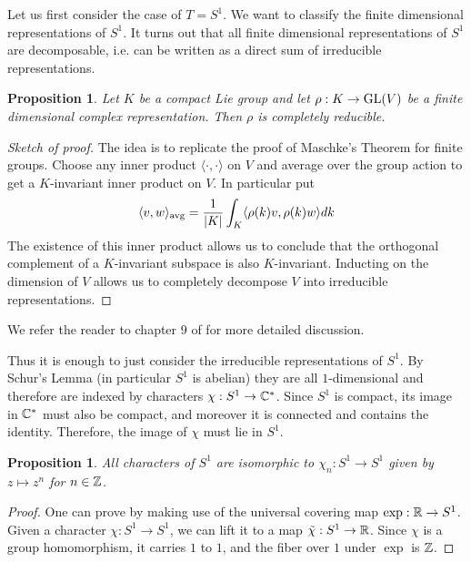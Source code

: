 \documentclass{amsart}
\numberwithin{equation}{section}
\theoremstyle{plain} %
\newtheorem{proposition}[equation]{Proposition}
\theoremstyle{definition}
\theoremstyle{remark}
\begin{document}
\hfill

Let us first consider the case of $T = S^1$. We want to classify the finite dimensional representations of $S^1$.
It turns out that all finite dimensional representations of $S^1$ are decomposable, i.e.
can be written as a direct sum of irreducible representations.

\begin{proposition}
	Let $K$ be a compact Lie group and let $\rho:K\to\operatorname{GL}(V)$ be a finite dimensional complex representation.
	Then $\rho$ is completely reducible.
\end{proposition}

\begin{proof}
	[Sketch of proof] The idea is to replicate the proof of Maschke's Theorem for finite groups.
	Choose any inner product $\langle\cdot,\cdot\rangle$ on $V$ and average over the group action to get a $K$-invariant inner product
	on $V$. In particular put \begin{align*}
		\langle v,w\rangle_{\text{avg}} = \frac{1}{\lvert K\vert}\int_K \langle \rho(k)v,\rho(k)w\rangle dk
	\end{align*}
	The existence of this inner product
	allows us to conclude that the orthogonal complement of a $K$-invariant subspace is also $K$-invariant.
	Inducting on the dimension of $V$ allows us to completely decompose $V$ into irreducible representations.
\end{proof}

We refer the reader to chapter 9 of \cite{fulton-harris} for more detailed discussion.

\hfill

Thus it is enough to just consider the irreducible representations of $S^1$.
By Schur's Lemma (in particular $S^1$ is abelian) they are all $1$-dimensional and
therefore are indexed by characters $\chi: S^1\to \mathbb{C}^*$.
Since $S^1$ is compact, its image in $\mathbb{C}^*$ must also be compact, and moreover
it is connected and contains the identity. Therefore, the image of $\chi$ must lie in $S^1$.


\begin{proposition}
	All characters of $S^1$ are isomorphic to $\chi_n: S^1\to S^1$ given by $z\mapsto z^n$ for $n\in \mathbb{Z}$.
\end{proposition}

\begin{proof}
	One can prove by making use of the universal covering map $\exp: \mathbb{R}\to S^1$.
	Given a character $\chi: S^1\to S^1$, we can lift it to a map $\tilde \chi: S^1\to \mathbb{R}$.
	Since $\chi$ is a group homomorphism, it carries $1$ to $1$, and the fiber over $1$ under $\exp$ is $\mathbb{Z}$.
\end{proof}
\end{document}

